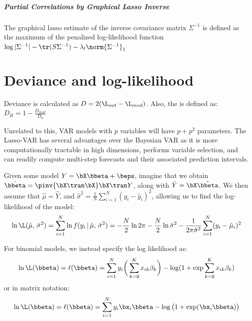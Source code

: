 \paragraph{Partial Correlations by Graphical Lasso Inverse}
The graphical lasso estimate of the inverse covariance matrix $\Sigma^{-1}$ is defined as the maximum of the penalized log-likelihood function $\log |\Sigma^{-1}| - \tr(S \Sigma^{-1}) - \lambda_l \norm{\Sigma^{-1}}_1$

\chapter{Deviance and log-likelihood}
\label{app:D}
Deviance is calculated as $D = 2(\L_{sat} - \L_{mod})$. Also, the  is defined as: $D_R = 1 - \frac{D_{mod}}{D_0}$

Unrelated to this, VAR models with $p$ variables will have $p + p^2$ parameters. The Lasso-VAR has several advantages over the Bayesian VAR as it is more computationally tractable in high dimensions, performs variable selection, and can readily compute multi-step forecasts and their associated prediction intervals.

Given some model $Y = \bX\bbeta + \beps$, imagine that we obtain $\hat{\bbeta} = \pinv{\bX\tran\bX}\bX\tran Y$, along with $\hat{Y} = \bX\hat{\bbeta}$. We then assume that $\hat{\mu} = \hat{Y}$, and $\hat{\sigma}^2 = \frac{1}{N}\sum\limits_{i=1}^N (y_i - \hat{y}_i)^2$, allowing us to find the log-likelihood of the model:
\begin{equation}
    \ln{\L(\hat{\mu},\,\hat{\sigma}^2)} = \sum_{i=1}^N \ln{f(y_i\,|\,\hat{\mu},\,\hat{\sigma}^2)} = -\frac{N}{2}\ln{2\pi} - \frac{N}{2}\ln{\hat{\sigma}^2} - \frac{1}{2\pi\hat{\sigma}^2} \sum_{i=1}^N (y_i - \hat{\mu}_i)^2
\end{equation}

For binomial models, we instead specify the log likelihood as:
\begin{equation}
    \ln\L(\bbeta) = \ell(\bbeta) = \sum_{i=1}^N y_i \bigg(\sum_{k=0}^K x_{ik} \beta_{k}\bigg) - \log(1 + \exp{\sum_{k=0}^K x_{ik}\beta_k})
\end{equation}
or in matrix notation:
\begin{equation}
    \ln\L(\bbeta) = \ell(\bbeta) = \sum_{i=1}^N y_i \bx_i\bbeta - \log\big(1 + \exp(\bx_i\bbeta)\big)
\end{equation}

